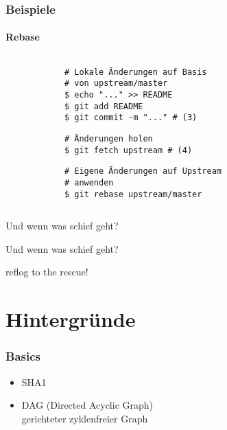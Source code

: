 \documentclass[]{beamer}
\begin{document}
\begin{frame}[fragile]
	\frametitle{Beispiele}
	\framesubtitle{Rebase}
	\begin{columns}[T]
		\begin{column}{7.5cm}
			\begin{verbatim}
			# Lokale Änderungen auf Basis
			# von upstream/master
			$ echo "..." >> README
			$ git add README
			$ git commit -m "..." # (3)
			\end{verbatim}

			\begin{verbatim}
			# Änderungen holen
			$ git fetch upstream # (4)
			\end{verbatim}

			\begin{verbatim}
			# Eigene Änderungen auf Upstream
			# anwenden
			$ git rebase upstream/master
			\end{verbatim}
		\end{column}
		\begin{column}{2.5cm}
		\end{column}
	\end{columns}
\end{frame}

\begin{frame}
	\fontsize{30}{10}\selectfont Und wenn was schief geht?
\end{frame}

\begin{frame}
	\fontsize{30}{10}\selectfont Und wenn was schief geht?
	\vspace*{0.5cm}

	\fontsize{20}{10}\selectfont reflog to the rescue!
\end{frame}

\section{Hintergründe}
\begin{frame}
	\frametitle{Basics}
	\begin{itemize}
		\item
			SHA1
		\item
			DAG (Directed Acyclic Graph)\\
			gerichteter zyklenfreier Graph
	\end{itemize}
\end{frame}
\end{document}
